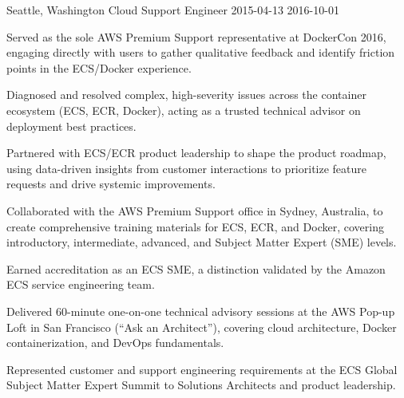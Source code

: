 \begin{role}
{\companyaws}
{Seattle, Washington}
{Cloud Support Engineer }
{2015-04-13}
{2016-10-01}
    \item Served as the sole AWS Premium Support representative at DockerCon 2016, engaging directly with users to gather qualitative feedback and identify friction points in the ECS/Docker experience.
    \item Diagnosed and resolved complex, high-severity issues across the container ecosystem (ECS, ECR, Docker), acting as a trusted technical advisor on deployment best practices.
    \item Partnered with ECS/ECR product leadership to shape the product roadmap, using data-driven insights from customer interactions to prioritize feature requests and drive systemic improvements.
    \item Collaborated with the AWS Premium Support office in Sydney, Australia, to create comprehensive training materials for ECS, ECR, and Docker, covering introductory, intermediate, advanced, and Subject Matter Expert (SME) levels.
    \item Earned accreditation as an ECS SME, a distinction validated by the Amazon ECS service engineering team.
    \item Delivered 60-minute one-on-one technical advisory sessions at the AWS Pop-up Loft in San Francisco (``Ask an Architect''), covering cloud architecture, Docker containerization, and DevOps fundamentals.
    \item Represented customer and support engineering requirements at the ECS Global Subject Matter Expert Summit to Solutions Architects and product leadership.
\end{role}
